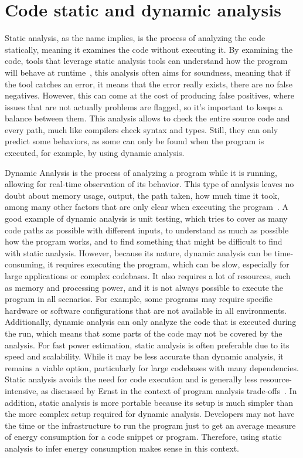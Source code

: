 \section{Code static and dynamic analysis} \label{sec:background_static_dynamic_analysis}

Static analysis, as the name implies, is the process of analyzing the code statically, meaning it examines the code without executing it. By examining the code, tools that leverage static analysis tools can understand how the program will behave at runtime~\cite{ernst2003static}, this analysis often aims for soundness, meaning that if the tool catches an error, it means that the error really exists, there are no false negatives. However, this can come at the cost of producing false positives, where issues that are not actually problems are flagged, so it's important to keeps a balance between them. This analysis allows to check the entire source code and every path, much like compilers check syntax and types. Still, they can only predict some behaviors, as some can only be found when the program is executed, for example, by using dynamic analysis.

Dynamic Analysis is the process of analyzing a program while it is running, allowing for real-time observation of its behavior.  This type of analysis leaves no doubt about memory usage, output, the path taken, how much time it took, among many other factors that are only clear when executing the program~\cite{ernst2003static}. A good example of dynamic analysis is unit testing, which tries to cover as many code paths as possible with different inputs, to understand as much as possible how the program works, and to find something that might be difficult to find with static analysis. However, because its nature, dynamic analysis can be time-consuming, it requires executing the program, which can be slow, especially for large applications or complex codebases. It also requires a lot of resources, such as memory and processing power, and it is not always possible to execute the program in all scenarios. For example, some programs may require specific hardware or software configurations that are not available in all environments. Additionally, dynamic analysis can only analyze the code that is executed during the run, which means that some parts of the code may not be covered by the analysis.
For fast power estimation, static analysis is often preferable due to its speed and scalability. While it may be less accurate than dynamic analysis, it remains a viable option, particularly for large codebases with many dependencies. Static analysis avoids the need for code execution and is generally less resource-intensive, as discussed by Ernst in the context of program analysis trade-offs~\cite{ernst2003static}.
In addition, static analysis is more portable because its setup is much simpler than the more complex setup required for dynamic analysis.
Developers may not have the time or the infrastructure to run the program just to get an average measure of energy consumption for a code snippet or program. Therefore, using static analysis to infer energy consumption makes sense in this context.

